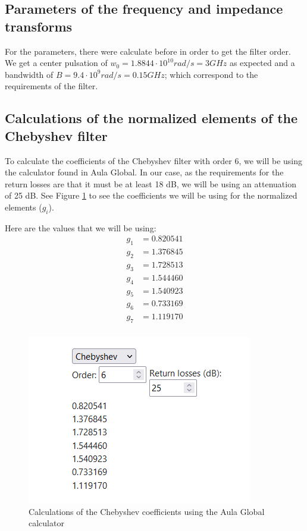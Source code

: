 \documentclass[12pt]{report} %
\begin{document}
\subsection{Parameters of the frequency and impedance transforms}

For the parameters, there were calculate before in order to get the filter order. We get a center pulsation of $w_0 = 1.8844 \cdot 10^{10} rad/s = 3 GHz$ as expected and a bandwidth of $B = 9.4 \cdot 10^{9} rad/s = 0.15 GHz$; which correspond to the requirements of the filter.

\subsection{Calculations of the normalized elements of the Chebyshev filter}

To calculate the coefficients of the Chebyshev filter with order 6, we will be using the calculator found in Aula Global. In our case, as the requirements for the return losses are that it must be at least 18 dB, we will be using an attenuation of 25 dB. See Figure \ref{fig:design_circuit_elements:chebyshev_filter_normalized_elements_calculator} to see the coefficients we will be using for the normalized elements ($g_i$). 

Here are the values that we will be using:
\begin{align*}
g_1 &= 0.820541 \\
g_2 &= 1.376845 \\
g_3 &= 1.728513 \\
g_4 &= 1.544460 \\
g_5 &= 1.540923 \\
g_6 &= 0.733169 \\
g_7 &= 1.119170 \\
\end{align*}

\begin{figure}
    \centering
    \includegraphics[width=1\linewidth]{images//design_circuit_elements/chebyshev_filter_normalized_elements_calculator.png}
    \caption{Calculations of the Chebyshev coefficients using the Aula Global calculator}
    \label{fig:design_circuit_elements:chebyshev_filter_normalized_elements_calculator}
\end{figure}
\end{document}
